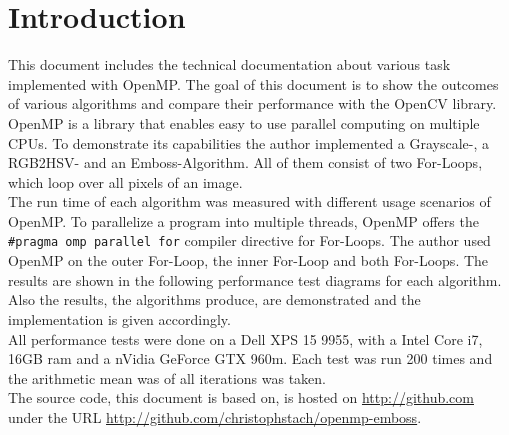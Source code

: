 \chapter{Introduction}

\noindent
This document includes the technical documentation about various task implemented with OpenMP. The goal of this document is to show the outcomes of various algorithms and compare their performance with the OpenCV library. OpenMP is a library that enables easy to use parallel computing on multiple CPUs. To demonstrate its capabilities the author implemented a Grayscale-, a RGB2HSV- and an Emboss-Algorithm. All of them consist of two For-Loops, which loop over all pixels of an image.\\

\noindent
The run time of each algorithm was measured with different usage scenarios of OpenMP. To parallelize a program into multiple threads, OpenMP offers the \texttt{#pragma omp parallel for} compiler directive for For-Loops.  The author used OpenMP on the outer For-Loop, the inner For-Loop and both For-Loops. The results are shown in the following performance test diagrams for each algorithm. Also the results, the algorithms produce, are demonstrated and the implementation is given accordingly.\\

\noindent
All performance tests were done on a Dell XPS 15 9955, with a Intel Core i7, 16GB ram and a nVidia GeForce GTX 960m. Each test was run 200 times and the arithmetic mean was of all iterations was taken. \\

\noindent
The source code, this document is based on, is hosted on \url{http://github.com} under the URL \url{http://github.com/christophstach/openmp-emboss}.

